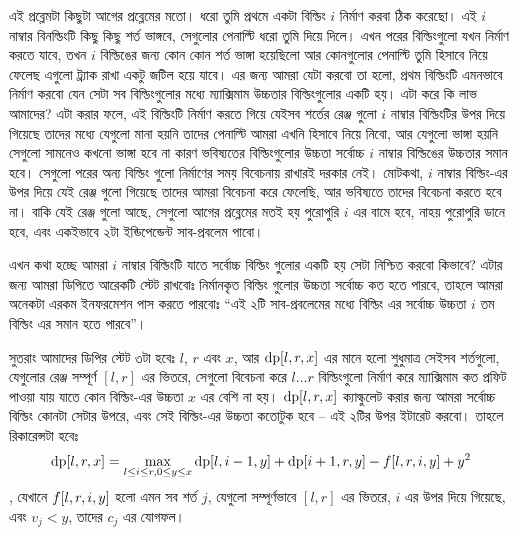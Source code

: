 \begin{solution}
  এই প্রব্লেমটা কিছুটা আগের প্রব্লেমের মতো। ধরো তুমি প্রথমে একটা বিল্ডিং $i$
  নির্মাণ করবা ঠিক করেছো। এই $i$ নাম্বার বিনল্ডিংটি কিছু কিছু শর্ত ভাঙ্গবে,
  সেগুলোর পেনাল্টি ধরো তুমি দিয়ে দিলে। এখন পরের বিল্ডিংগুলো যখন নির্মাণ করতে
  যাবে, তখন $i$ বিল্ডিঙের জন্য কোন কোন শর্ত ভাঙ্গা হয়েছিলো আর কোনগুলোর
  পেনাল্টি তুমি হিসাবে নিয়ে ফেলেছ এগুলো ট্র্যাক রাখা একটু জটিল হয়ে যাবে। এর
  জন্য আমরা যেটা করবো তা হলো, প্রথম বিল্ডিংটি এমনভাবে নির্মাণ করবো যেন
  সেটা সব বিল্ডিংগুলোর মধ্যে ম্যাক্সিমাম উচ্চতার বিল্ডিংগুলোর একটি হয়। এটা
  করে কি লাভ আমাদের? এটা করার ফলে, এই বিল্ডিংটি নির্মাণ করতে গিয়ে যেইসব
  শর্তের রেঞ্জ গুলো $i$ নাম্বার বিল্ডিংটির উপর দিয়ে গিয়েছে তাদের মধ্যে যেগুলো
  মানা হয়নি তাদের পেনাল্টি আমরা এখনি হিসাবে নিয়ে নিবো, আর যেগুলো ভাঙ্গা হয়নি
  সেগুলো সামনেও কখনো ভাঙ্গা হবে না কারণ ভবিষ্যতের বিল্ডিংগুলোর উচ্চতা
  সর্বোচ্চ $i$ নাম্বার বিল্ডিঙের উচ্চতার সমান হবে। সেগুলো পরের অন্য বিল্ডিং
  গুলো নির্মাণের সময় বিবেচনায় রাখারই দরকার নেই। মোটকথা, $i$ নাম্বার
  বিল্ডিং-এর উপর দিয়ে যেই রেঞ্জ গুলো গিয়েছে তাদের আমরা বিবেচনা করে ফেলেছি, আর
  ভবিষ্যতে তাদের বিবেচনা করতে হবে না। বাকি যেই রেঞ্জ গুলো আছে, সেগুলো আগের
  প্রব্লেমের মতই হয় পুরোপুরি $i$ এর বামে হবে, নাহয় পুরোপুরি ডানে হবে, এবং
  একইভাবে ২টা ইন্ডিপেন্ডেন্ট সাব-প্রবলেম পাবো।
  
  এখন কথা হচ্ছে আমরা $i$ নাম্বার বিল্ডিংটি যাতে সর্বোচ্চ বিল্ডিং গুলোর একটি
  হয় সেটা নিশ্চিত করবো কিভাবে? এটার জন্য আমরা ডিপিতে আরেকটি স্টেট রাখবোঃ
  নির্মানকৃত বিল্ডিং গুলোর উচ্চতা সর্বোচ্চ কত হতে পারবে, তাহলে আমরা অনেকটা
  এরকম ইনফরমেশন পাস করতে পারবোঃ ``এই ২টি সাব-প্রবলেমের মধ্যে বিল্ডিং এর
  সর্বোচ্চ উচ্চতা $i$ তম বিল্ডিং এর সমান হতে পারবে''।

  সুতরাং আমাদের ডিপির স্টেট ৩টা হবেঃ $l$, $r$ এবং $x$, আর
  $\text{dp}[l, r, x]$ এর মানে হলো শুধুমাত্র সেইসব শর্তগুলো, যেগুলোর রেঞ্জ
  সম্পূর্ণ $[l, r]$ এর ভিতরে, সেগুলো বিবেচনা করে $l \ldots r$ বিল্ডিংগুলো
  নির্মাণ করে ম্যাক্সিমাম কত প্রফিট পাওয়া যায় যাতে কোন বিল্ডিং-এর উচ্চতা $x$
  এর বেশি না হয়। $\text{dp}[l, r, x]$ ক্যাল্কুলেট করার জন্য আমরা সর্বোচ্চ
  বিল্ডিং কোনটা সেটার উপরে, এবং সেই বিল্ডিং-এর উচ্চতা কতোটুক হবে -- এই ২টির
  উপর ইটারেট করবো। তাহলে রিকারেন্সটা হবেঃ
  \[
    \text{dp}[l, r, x] = \max_{l \le i \le r, 0 \le y \le x}
    \text{dp}[l, i-1, y] + \text{dp}[i+1, r, y] - f[l, r, i, y] + y^2
  \], যেখানে $f[l, r, i, y]$ হলো এমন সব শর্ত $j$, যেগুলো সম্পূর্ণভাবে
  $[l, r]$ এর ভিতরে, $i$ এর উপর দিয়ে গিয়েছে, এবং $v_j < y$, তাদের $c_j$ এর
  যোগফল।
\end{solution}


